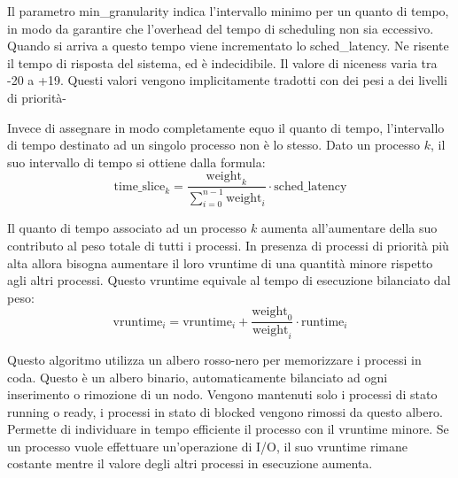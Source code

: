 \documentclass{article}
\numberwithin{equation}{subsection}
\begin{document}
Il parametro min\_granularity indica l'intervallo minimo per un quanto di tempo, in modo da garantire che l'overhead del tempo di scheduling non sia eccessivo. 
Quando si arriva a questo tempo viene incrementato lo sched\_latency. Ne risente il tempo di risposta del sistema, ed è indecidibile. Il valore di niceness varia 
tra -20 a +19. Questi valori vengono implicitamente tradotti con dei pesi a dei livelli di priorità- 

Invece di assegnare in modo completamente equo il quanto di tempo, l'intervallo di tempo destinato ad un singolo processo non è lo stesso. Dato un processo $k$, 
il suo intervallo di tempo si ottiene dalla formula:
\begin{equation}
    \mathrm{time\_slice}_k=\displaystyle\frac{\mathrm{weight}_k}{\displaystyle\sum_{i=0}^{n-1}\mathrm{weight}_i}\cdot\mathrm{sched\_latency}
\end{equation}

Il quanto di tempo associato ad un processo $k$ aumenta all'aumentare della suo contributo al peso totale di tutti i processi. In presenza di processi di priorità 
più alta allora bisogna aumentare il loro vruntime di una quantità minore rispetto agli altri processi. Questo vruntime equivale al tempo di esecuzione bilanciato dal 
peso:
\begin{equation}
    \mathrm{vruntime}_i=\mathrm{vruntime}_i+\displaystyle\frac{\mathrm{weight}_0}{\mathrm{weight}_i}\cdot\mathrm{runtime}_i
\end{equation}


Questo algoritmo utilizza un albero rosso-nero per memorizzare i processi in coda. Questo è un albero binario, automaticamente bilanciato ad ogni inserimento o 
rimozione di un nodo. Vengono mantenuti solo i processi di stato running o ready, i processi in stato di blocked vengono rimossi da questo albero. Permette di 
individuare in tempo efficiente il processo con il vruntime minore. 
Se un processo vuole effettuare un'operazione di I/O, il suo vruntime rimane costante mentre il valore degli altri processi in esecuzione aumenta. %
\end{document}
